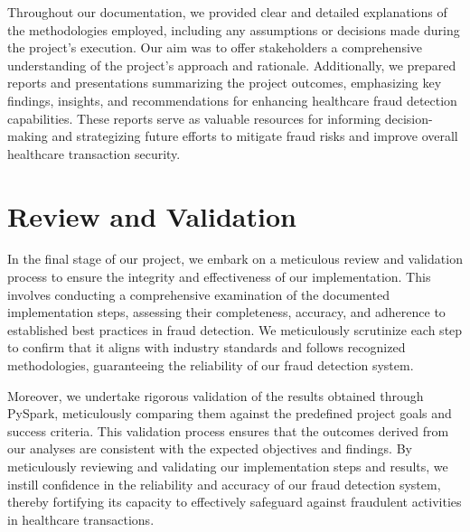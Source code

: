 \documentclass{article}
\begin{document}
\hspace{0.5cm}Throughout our documentation, we provided clear and detailed explanations of the methodologies employed, including any assumptions or decisions made during the project's execution. Our aim was to offer stakeholders a comprehensive understanding of the project's approach and rationale. Additionally, we prepared reports and presentations summarizing the project outcomes, emphasizing key findings, insights, and recommendations for enhancing healthcare fraud detection capabilities. These reports serve as valuable resources for informing decision-making and strategizing future efforts to mitigate fraud risks and improve overall healthcare transaction security.

\section{Review and Validation}
\hspace{1cm}In the final stage of our project, we embark on a meticulous review and validation process to ensure the integrity and effectiveness of our implementation. This involves conducting a comprehensive examination of the documented implementation steps, assessing their completeness, accuracy, and adherence to established best practices in fraud detection. We meticulously scrutinize each step to confirm that it aligns with industry standards and follows recognized methodologies, guaranteeing the reliability of our fraud detection system.

\hspace{0.5cm}Moreover, we undertake rigorous validation of the results obtained through PySpark, meticulously comparing them against the predefined project goals and success criteria. This validation process ensures that the outcomes derived from our analyses are consistent with the expected objectives and findings. By meticulously reviewing and validating our implementation steps and results, we instill confidence in the reliability and accuracy of our fraud detection system, thereby fortifying its capacity to effectively safeguard against fraudulent activities in healthcare transactions.
\end{document}
